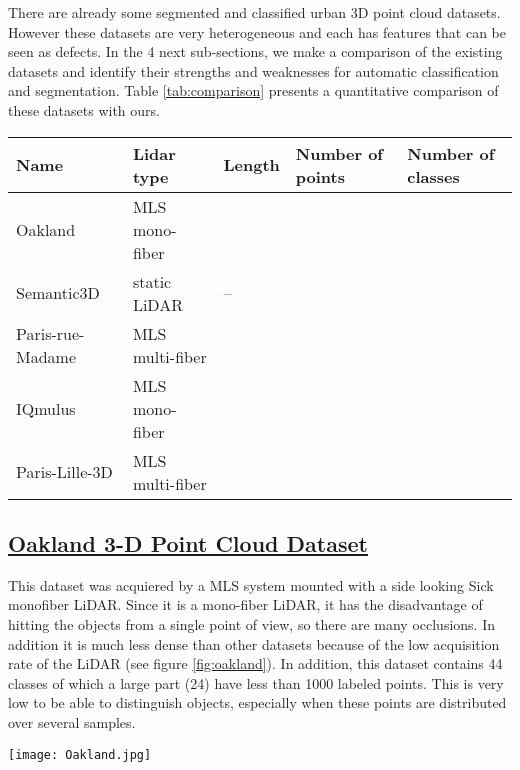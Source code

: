 \documentclass[a4paper, 10pt, journal]{article}
\begin{document}
There are already some segmented and classified urban 3D point cloud datasets. However these datasets are very heterogeneous and each has features that can be seen as defects. In the 4 next sub-sections, we make a comparison of the existing datasets and identify their strengths and weaknesses for automatic classification and segmentation. Table \ref{tab:comparison} presents a quantitative comparison of these datasets with ours.

\begin{table*}\centering
 \begin{tabular}{C{2.3cm}C{2.5cm}C{2.0cm}C{2.2cm}C{2.2cm}}
  \toprule
   \textbf{Name} & \textbf{Lidar type} & \textbf{Length} & \textbf{Number of points} & \textbf{Number of classes} \\\midrule
   Oakland & MLS mono-fiber &  &  &  \\\midrule
   Semantic3D & static LiDAR & -- &  &  \\\midrule
   Paris-rue-Madame & MLS multi-fiber &  &  &  \\\midrule
   IQmulus & MLS mono-fiber &  &  &  \\\midrule
   Paris-Lille-3D & MLS multi-fiber &  &  &  \\
  \bottomrule 
 \end{tabular}
\end{table*}

\subsection{\href{http://www.cs.cmu.edu/~vmr/datasets/oakland_3d/cvpr09/doc/}{Oakland 3-D Point Cloud Dataset} \cite{munoz2009contextual}}\label{subsec:oakland}
This dataset was acquiered by a MLS system mounted with a side looking Sick monofiber LiDAR. Since it is a mono-fiber LiDAR, it has the disadvantage of hitting the objects from a single point of view, so there are many occlusions. In addition it is much less dense than other datasets because of the low acquisition rate of the LiDAR (see figure \ref{fig:oakland}).
In addition, this dataset contains 44 classes of which a large part (24) have less than 1000 labeled points. This is very low to be able to distinguish objects, especially when these points are distributed over several samples.

\begin{center}\centering
 \texttt{[image: Oakland.jpg]}
\end{center}
\end{document}
